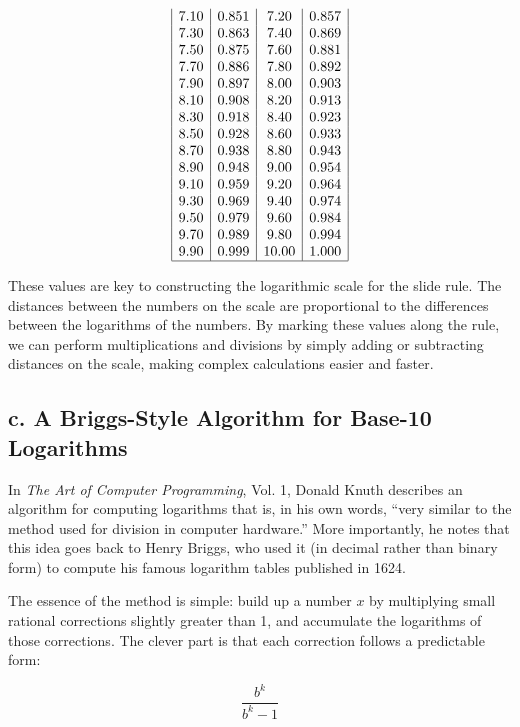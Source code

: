 \documentclass[10pt,twocolumn]{article}
\begin{document}
\[\begin{array}{|c|c|c|c|}
7.10 & 0.851 & 7.20 & 0.857 \\
7.30 & 0.863 & 7.40 & 0.869 \\
7.50 & 0.875 & 7.60 & 0.881 \\
7.70 & 0.886 & 7.80 & 0.892 \\
7.90 & 0.897 & 8.00 & 0.903 \\
8.10 & 0.908 & 8.20 & 0.913 \\
8.30 & 0.918 & 8.40 & 0.923 \\
8.50 & 0.928 & 8.60 & 0.933 \\
8.70 & 0.938 & 8.80 & 0.943 \\
8.90 & 0.948 & 9.00 & 0.954 \\
9.10 & 0.959 & 9.20 & 0.964 \\
9.30 & 0.969 & 9.40 & 0.974 \\
9.50 & 0.979 & 9.60 & 0.984 \\
9.70 & 0.989 & 9.80 & 0.994 \\
9.90 & 0.999 & 10.00 & 1.000 \\
\hline
\end{array}
\]

These values are key to constructing the logarithmic scale for the slide rule. The distances between the numbers on the scale are proportional to the differences between the logarithms of the numbers. By marking these values along the rule, we can perform multiplications and divisions by simply adding or subtracting distances on the scale, making complex calculations easier and faster.

\subsection*{c. A Briggs-Style Algorithm for Base-10 Logarithms}

In \textit{The Art of Computer Programming}, Vol. 1, Donald Knuth describes an algorithm for computing logarithms that is, in his own words, “very similar to the method used for division in computer hardware.” More importantly, he notes that this idea goes back to Henry Briggs, who used it (in decimal rather than binary form) to compute his famous logarithm tables published in 1624.

The essence of the method is simple: build up a number \( x \) by multiplying small rational corrections slightly greater than 1, and accumulate the logarithms of those corrections. The clever part is that each correction follows a predictable form:

\[
\frac{b^k}{b^k - 1}
\]
\end{document}
